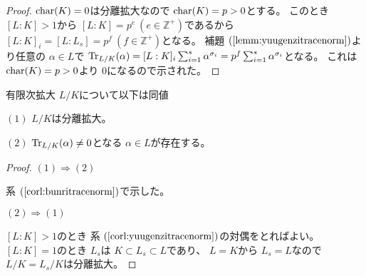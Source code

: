 \documentclass[../master_galois_theory]{subfiles}
\begin{document}
\begin{proof}
  $\mathrm{char}(K) = 0$は分離拡大なので $\mathrm{char}(K) = p > 0$とする。
  このとき $[L:K] > 1$から $[L:K] = p^e \  (e \in \mathbb{Z}^+)$であるから
  $[L:K]_i = [L:L_s] = p^f \  (f \in \mathbb{Z}^+)$となる。
  補題 $(\mathrm{\ref{lemm:yuugenzitracenorm}})$より任意の $\alpha \in L$で
  $\mathrm{Tr}_{L/K}(\alpha) = [L:K]_i \sum_{i=1}^s \alpha^{\sigma_i} = p^f \sum_{i=1}^s \alpha^{\sigma_i}$となる。
  これは $\mathrm{char}(K) = p > 0$より $0$になるので示された。
\end{proof}

\begin{prop}
  有限次拡大 $L/K$について以下は同値

  $(1)$
  $L/K$は分離拡大。

  $(2)$
  $\mathrm{Tr}_{L/K}(\alpha) \neq 0$となる $\alpha \in L$が存在する。
\end{prop}

\begin{proof}
  $(1) \Rightarrow (2)$

  系 $(\mathrm{\ref{corl:bunritracenorm}})$で示した。

  $(2) \Rightarrow (1)$

  $[L:K] > 1$のとき
  系 $(\mathrm{\ref{corl:yuugenzitracenorm}})$の対偶をとればよい。
  $[L:K] = 1$のとき $L_s$は $K \subset L_s \subset L$であり、
  $L = K$から $L_s = L$なので $L/K = L_s/K$は分離拡大。

\end{proof}
\end{document}
